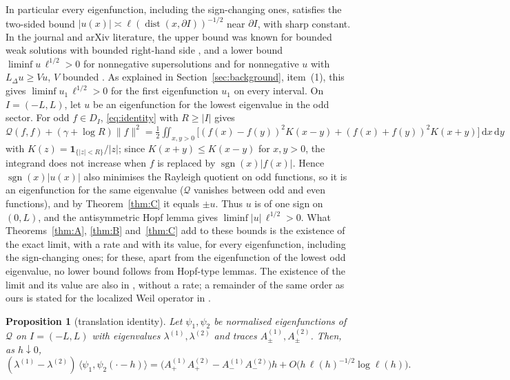 \documentclass[11pt]{amsart}
\newcommand{\LD}{L_\Delta}
\newcommand{\one}{\mathbf{1}}
\newcommand{\dd}{\,\mathrm{d}}
\DeclareMathOperator{\dist}{dist}
\newtheorem{proposition}[theorem]{Proposition}
\theoremstyle{definition}
\theoremstyle{remark}
\numberwithin{equation}{section}
\begin{document}
In particular every eigenfunction, including the sign-changing ones, satisfies the two-sided bound $|u(x)|\asymp\ell(\dist(x,\partial I))^{-1/2}$ near $\partial I$, with sharp constant. In the journal and arXiv literature, the upper bound was known for bounded weak solutions with bounded right-hand side \cite[Thm.~1.1]{HLS25}, and a lower bound $\liminf u\,\ell^{1/2}>0$ for nonnegative supersolutions \cite[Thm.~1.4]{HLS25} and for nonnegative $u$ with $\LD u\ge Vu$, $V$ bounded \cite[Lemma~3.11]{PS25}. As explained in Section~\ref{sec:background}, item~(1), this gives $\liminf u_1\,\ell^{1/2}>0$ for the first eigenfunction $u_1$ on every interval. On $I=(-L,L)$, let $u$ be an eigenfunction for the lowest eigenvalue in the odd sector. For odd $f\in D_I$, \eqref{eq:identity} with $R\ge|I|$ gives $\mathcal Q(f,f)+(\gamma+\log R)\|f\|^2=\frac12\iint_{x,y>0}\bigl[(f(x)-f(y))^2K(x-y)+(f(x)+f(y))^2K(x+y)\bigr]\dd x\dd y$ with $K(z)=\one_{\{|z|<R\}}/|z|$; since $K(x+y)\le K(x-y)$ for $x,y>0$, the integrand does not increase when $f$ is replaced by $\operatorname{sgn}(x)|f(x)|$. Hence $\operatorname{sgn}(x)|u(x)|$ also minimises the Rayleigh quotient on odd functions, so it is an eigenfunction for the same eigenvalue ($\mathcal Q$ vanishes between odd and even functions), and by Theorem~\ref{thm:C} it equals $\pm u$. Thus $u$ is of one sign on $(0,L)$, and the antisymmetric Hopf lemma \cite[Lemma~3.4]{PS25} gives $\liminf|u|\,\ell^{1/2}>0$. What Theorems~\ref{thm:A}, \ref{thm:B} and~\ref{thm:C} add to these bounds is the existence of the exact limit, with a rate and with its value, for every eigenfunction, including the sign-changing ones; for these, apart from the eigenfunction of the lowest odd eigenvalue, no lower bound follows from Hopf-type lemmas. The existence of the limit and its value are also in \cite[\S3.3 and Cor.~2.3]{BT26}, without a rate; a remainder of the same order as ours is stated for the localized Weil operator in \cite[PL-329, PL-336, PL-337]{Mathia26}.

\begin{proposition}[translation identity]\label{prop:transl}
Let $\psi_1,\psi_2$ be normalised eigenfunctions of $\mathcal Q$ on $I=(-L,L)$ with eigenvalues $\lambda^{(1)},\lambda^{(2)}$ and traces $A_\pm^{(1)},A_\pm^{(2)}$. Then, as $h\downarrow0$,
\[
(\lambda^{(1)}-\lambda^{(2)})\,\langle\psi_1,\psi_2(\cdot-h)\rangle=\bigl(A_+^{(1)}A_+^{(2)}-A_-^{(1)}A_-^{(2)}\bigr)h+O\bigl(h\,\ell(h)^{-1/2}\log\ell(h)\bigr).
\]
\end{proposition}
\end{document}
